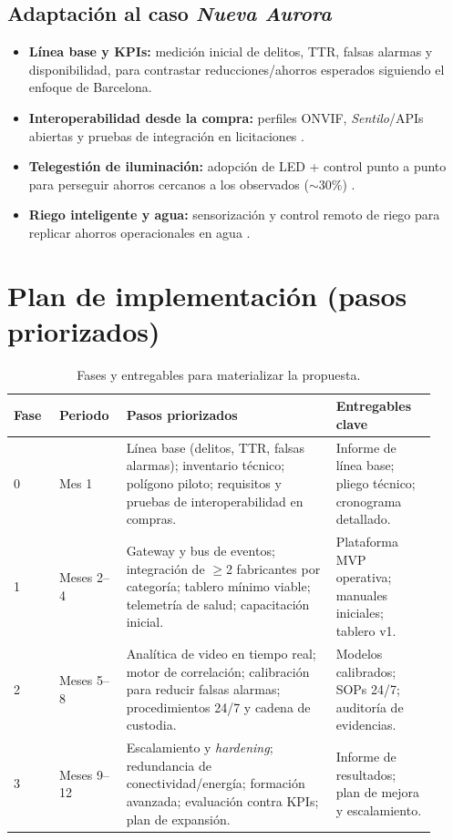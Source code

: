 \documentclass[12pt,a4paper]{article}
\begin{document}
\subsection*{Adaptación al caso \textit{Nueva Aurora}}
\begin{itemize}
  \item \textbf{Línea base y KPIs:} medición inicial de delitos, TTR, falsas alarmas y disponibilidad, para contrastar reducciones/ahorros esperados siguiendo el enfoque de Barcelona.
  \item \textbf{Interoperabilidad desde la compra:} perfiles ONVIF, \textit{Sentilo}/APIs abiertas y pruebas de integración en licitaciones \cite{sentiloCaseStudy}.
  \item \textbf{Telegestión de iluminación:} adopción de LED + control punto a punto para perseguir ahorros cercanos a los observados (\(\sim 30\%\)) \cite{harvardAsh,ajuntamentStreetLighting}.
  \item \textbf{Riego inteligente y agua:} sensorización y control remoto de riego para replicar ahorros operacionales en agua \cite{ciscoBarcelona}.
\end{itemize}

\newpage
\section{Plan de implementación (pasos priorizados)}

\begin{table}[htbp]
\centering
\caption{Fases y entregables para materializar la propuesta.}
\begin{tabular}{p{0.10\linewidth} p{0.14\linewidth} p{0.46\linewidth} p{0.22\linewidth}}
\hline
\textbf{Fase} & \textbf{Periodo} & \textbf{Pasos priorizados} & \textbf{Entregables clave} \\
\hline
0 & Mes 1 &
Línea base (delitos, TTR, falsas alarmas); inventario técnico; polígono piloto; requisitos y pruebas de interoperabilidad en compras. &
Informe de línea base; pliego técnico; cronograma detallado. \\
\hline
1 & Meses 2--4 &
Gateway y bus de eventos; integración de \(\geq\)2 fabricantes por categoría; tablero mínimo viable; telemetría de salud; capacitación inicial. &
Plataforma MVP operativa; manuales iniciales; tablero v1. \\
\hline
2 & Meses 5--8 &
Analítica de video en tiempo real; motor de correlación; calibración para reducir falsas alarmas; procedimientos 24/7 y cadena de custodia. &
Modelos calibrados; SOPs 24/7; auditoría de evidencias. \\
\hline
3 & Meses 9--12 &
Escalamiento y \textit{hardening}; redundancia de conectividad/energía; formación avanzada; evaluación contra KPIs; plan de expansión. &
Informe de resultados; plan de mejora y escalamiento. \\
\hline
\end{tabular}
\end{table}
\end{document}

